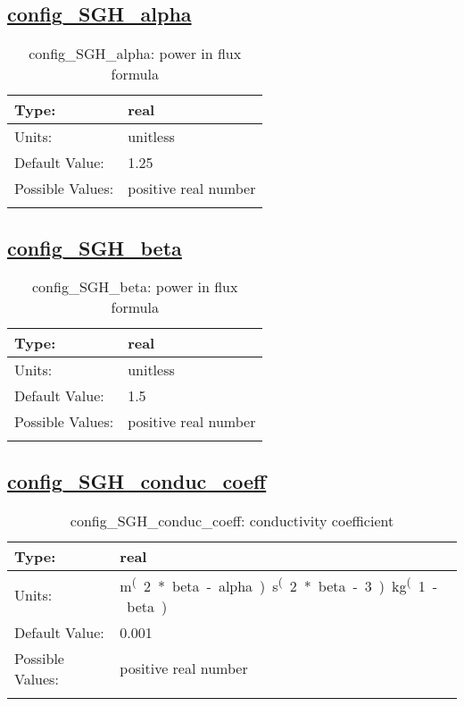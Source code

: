 \subsection[config\_SGH\_alpha]{\hyperref[sec:nm_tab_subglacial_hydro]{config\_SGH\_alpha}}
\label{subsec:nm_sec_config_SGH_alpha}
\begin{center}
\begin{longtable}{| p{2.0in} || p{4.0in} |}
    \hline
    Type: & real \\
    \hline
    Units: & \si{unitless} \\
    \hline
    Default Value: & 1.25 \\
    \hline
    Possible Values: & positive real number \\
    \hline
    \caption{config\_SGH\_alpha: power in flux formula}
\end{longtable}
\end{center}
\subsection[config\_SGH\_beta]{\hyperref[sec:nm_tab_subglacial_hydro]{config\_SGH\_beta}}
\label{subsec:nm_sec_config_SGH_beta}
\begin{center}
\begin{longtable}{| p{2.0in} || p{4.0in} |}
    \hline
    Type: & real \\
    \hline
    Units: & \si{unitless} \\
    \hline
    Default Value: & 1.5 \\
    \hline
    Possible Values: & positive real number \\
    \hline
    \caption{config\_SGH\_beta: power in flux formula}
\end{longtable}
\end{center}
\subsection[config\_SGH\_conduc\_coeff]{\hyperref[sec:nm_tab_subglacial_hydro]{config\_SGH\_conduc\_coeff}}
\label{subsec:nm_sec_config_SGH_conduc_coeff}
\begin{center}
\begin{longtable}{| p{2.0in} || p{4.0in} |}
    \hline
    Type: & real \\
    \hline
    Units: & \si{m^(2*beta-alpha).s^(2*beta-3).kg^(1-beta)} \\
    \hline
    Default Value: & 0.001 \\
    \hline
    Possible Values: & positive real number \\
    \hline
    \caption{config\_SGH\_conduc\_coeff: conductivity coefficient}
\end{longtable}
\end{center}
